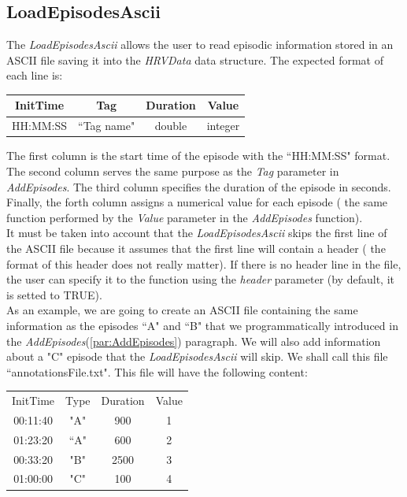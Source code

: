 \documentclass[12pt,lot, lof]{puthesis}
\begin{document}
\subsection{LoadEpisodesAscii} The \textit{LoadEpisodesAscii} allows the user 
to read episodic information stored in an ASCII file saving it into the 
\textit{HRVData} data structure. The expected format of each line is:\\
\begin{center}
\begin{tabular}{ c c c c }
InitTime &Tag & Duration&  Value\\
\hline
HH:MM:SS  &``Tag name"& double &integer
\end{tabular}
\end{center} 
The first column is the start time of the episode with the ``HH:MM:SS" format. 
The second column serves the same purpose as the \textit{Tag} parameter in 
\textit{AddEpisodes}. The third column specifies the duration of the episode in 
seconds. Finally, the forth column assigns a  numerical value for each episode 
( the same function performed by the \textit{Value} parameter in the 
\textit{AddEpisodes} function). \\

It must be taken into account that the \textit{LoadEpisodesAscii} skips the 
first line of the ASCII file because it assumes that the first line will 
contain a header ( the format of this header does not really matter). If there 
is no header line in the file, the user
can specify it to the function using the \textit{header} parameter (by default, 
it is
setted to TRUE).\\

As an example, we are going to create an ASCII file containing the same 
information as the episodes ``A" and ``B" that we programmatically introduced 
in the \textit{AddEpisodes}(\ref{par:AddEpisodes}) paragraph. We will also add 
information about a "C" episode that the \textit{LoadEpisodesAscii} will skip. 
We shall call this file ``annotationsFile.txt". This file will have the 
following content:
\begin{center}
\begin{tabular}{ c c c c }
InitTime&  Type & Duration&  Value\\
00:11:40 & "A"& 900 &1\\
01:23:20 & ``A" &600 &2\\
00:33:20 & "B" &2500 &3\\
01:00:00 & "C"& 100 &4\\
\end{tabular}
\end{center} 
\end{document}
